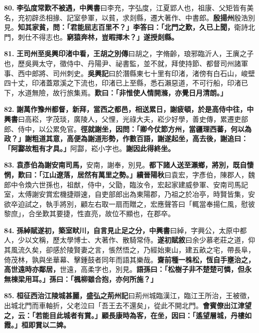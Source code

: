 \textbf{80.} \textbf{李弘度常歎不被遇，}{\footnotesize \textbf{中興書}曰李充，字弘度，江夏郢人也，祖康、父矩皆有美名，充初辟丞相掾、記室參軍，以貧，求剡縣，遷大著作、中書郎。}\textbf{殷揚州}{\footnotesize 殷浩別見。}\textbf{知其家貧，問：「君能屈志百里不？」李答曰：「北門之歎，久已上聞，}{\footnotesize 衛詩北門，刺仕不得志也。}\textbf{窮猿奔林，豈暇擇木？」遂授剡縣。}

\textbf{81.} \textbf{王司州至吳興印渚中看，}{\footnotesize \textbf{王胡之別傳}曰胡之，字脩齡，琅邪臨沂人，王廙之子也，歷吳興太守，徵侍中、丹陽尹、祕書監，並不就，拜使持節、都督司州諸軍事、西中郎將、司州刺史。\textbf{吳興記}曰於潛縣東七十里有印渚，渚傍有白石山，峻壁四十丈，印渚蓋眾溪之下流也，印渚已上至縣，悉石瀨惡道，不可行船，印渚已下，水道無險，故行旅集焉。}\textbf{歎曰：「非惟使人情開滌，亦覺日月清朗。」}

\textbf{82.} \textbf{謝萬作豫州都督，新拜，當西之都邑，相送累日，謝疲頓，於是高侍中往，}{\footnotesize \textbf{中興書}曰高崧，字茂琰，廣陵人，父悝，光祿大夫，崧少好學，善史傳，累遷吏部郎、侍中，以公累免官。}\textbf{徑就謝坐，因問：「卿今仗節方州，當疆理西蕃，何以為政？」謝粗道其意，高便為謝道形勢，作數百語，謝遂起坐，高去後，謝追曰：「阿酃故粗有才具。」}{\footnotesize 阿酃，崧小字也。}\textbf{謝因此得終坐。}

\textbf{83.} \textbf{袁彥伯為謝安南司馬，}{\footnotesize 安南，謝奉，別見。}\textbf{都下諸人送至瀨鄉，將別，既自悽惘，歎曰：「江山遼落，居然有萬里之勢。」}{\footnotesize \textbf{續晉陽秋}曰袁宏，字彥伯，陳郡人，魏郎中令煥六世孫也，祖猷，侍中，父勖，臨汝令，宏起家建威參軍、安南司馬記室，太傅謝安賞宏機捷辯速，自吏部郎出為東陽郡，乃祖之於冶亭，時賢皆集，安欲卒迫試之，執手將別，顧左右取一扇而贈之，宏應聲答曰「輒當奉揚仁風，慰彼黎庶」，合坐歎其要捷，性直亮，故位不顯也，在郡卒。}

\textbf{84.} \textbf{孫綽賦遂初，築室畎川，自言見止足之分，}{\footnotesize \textbf{中興書}曰綽，字興公，太原中都人，少以文稱，歷太學博士、大著作、散騎常侍。\textbf{遂初賦敘}曰余少慕老莊之道，仰其風流久矣，卻感於陵賢妻之言，悵然悟之，乃經始東山，建五畝之宅，帶長阜，倚茂林，孰與坐華幕、擊鍾鼓者同年而語其樂哉。}\textbf{齋前種一株松，恆自手壅治之，高世遠時亦鄰居，}{\footnotesize 世遠，高柔字也，別見。}\textbf{語孫曰：「松樹子非不楚楚可憐，但永無棟梁用耳。」孫曰：「楓柳雖合抱，亦何所施？」}

\textbf{85.} \textbf{桓征西治江陵城甚麗，}{\footnotesize \textbf{盛弘之荊州記}曰荊州城臨漢江，臨江王所治，王被徵，出城北門而車軸折，父老泣曰「吾王去不還矣」，從此不開北門。}\textbf{會賓僚出江津望之，云：「若能目此城者有賞。」顧長康時為客，在坐，因曰：「遙望層城，丹樓如霞。」桓即賞以二婢。}

